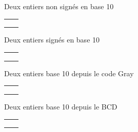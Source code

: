 \documentclass[11pt,a4paper]{article}
\begin{document}
\smallskip

\begin{table}[!ht]
  \centering
  \begin{minipage}{0.50\textwidth}
    \centering

Deux entiers non signés en base 10

\medskip

\begin{tabular}{| C{3cm} | C{3cm} |}
\hline
\phantom{42} & \phantom{42} \\
\phantom{42} & \phantom{42} \\
\phantom{42} & \phantom{42} \\
\hline
\end{tabular}

  \end{minipage}
  \hfillx
  \begin{minipage}{0.50\textwidth}
    \centering

Deux entiers signés en base 10

\medskip

\begin{tabular}{| C{3cm} | C{3cm} |}
\hline
\phantom{42} & \phantom{42} \\
\phantom{42} & \phantom{42} \\
\phantom{42} & \phantom{42} \\
\hline
\end{tabular}

  \end{minipage}
\end{table}

\smallskip

\begin{table}[!ht]
  \centering
  \begin{minipage}{0.50\textwidth}
    \centering

Deux entiers base 10 depuis le code Gray

\medskip

\begin{tabular}{| C{3cm} | C{3cm} |}
\hline
\phantom{42} & \phantom{42} \\
\phantom{42} & \phantom{42} \\
\phantom{42} & \phantom{42} \\
\hline
\end{tabular}

  \end{minipage}
  \hfillx
  \begin{minipage}{0.50\textwidth}
    \centering

Deux entiers base 10 depuis le BCD

\medskip

\begin{tabular}{| C{3cm} | C{3cm} |}
\hline
\phantom{42} & \phantom{42} \\
\phantom{42} & \phantom{42} \\
\phantom{42} & \phantom{42} \\
\hline
\end{tabular}

  \end{minipage}
\end{table}
\end{document}
